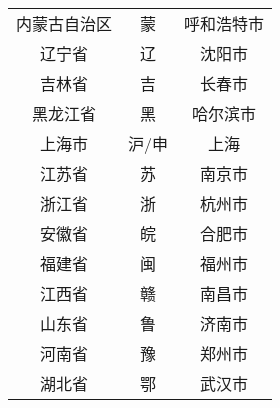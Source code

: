 \begin{longtable}{ccc}
	内蒙古自治区      & 蒙   & 呼和浩特市                                                                                                                                \\
	辽宁省         & 辽   & 沈阳市                                                                                                                                  \\
	吉林省         & 吉   & 长春市                                                                                                                                  \\
	黑龙江省        & 黑   & 哈尔滨市                                                                                                                                 \\
	上海市         & 沪/申 & 上海                                                                                                                                   \\
	江苏省         & 苏   & 南京市                                                                                                                                  \\
	浙江省         & 浙   & 杭州市                                                                                                                                  \\
	安徽省         & 皖   & 合肥市                                                                                                                                  \\
	福建省         & 闽   & 福州市                                                                                                                                  \\
	江西省         & 赣   & 南昌市                                                                                                                                  \\
	山东省         & 鲁   & 济南市                                                                                                                                  \\
	河南省         & 豫   & 郑州市                                                                                                                                  \\
	湖北省         & 鄂   & 武汉市                                                                                                                                  \\

\end{longtable}
